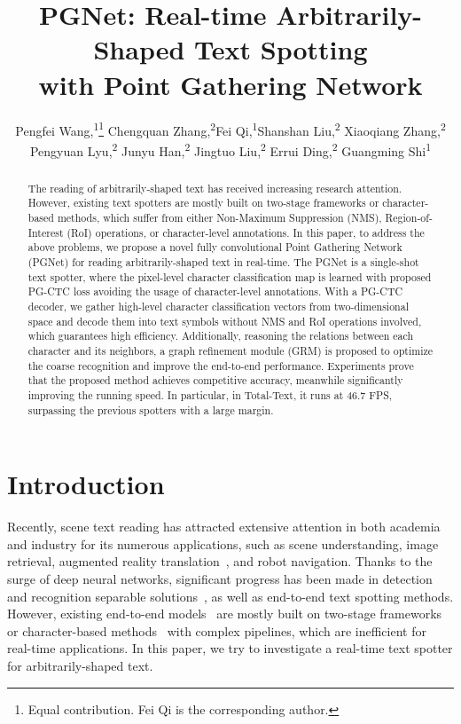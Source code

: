 \documentclass[letterpaper]{article} \usepackage{aaai21}  \usepackage{times}  \usepackage{helvet} \usepackage{courier}  \usepackage[hyphens]{url}  \usepackage{graphicx} \urlstyle{rm} \def\UrlFont{\rm}  \usepackage{natbib}  \usepackage{caption} \usepackage{bm}
\title{PGNet: Real-time Arbitrarily-Shaped Text Spotting\\ with Point Gathering Network}
\author{
Pengfei Wang,\textsuperscript{\rm 1}\thanks{Equal contribution. Fei Qi is the corresponding author.}
    Chengquan Zhang,\textsuperscript{\rm 2}\footnotemark[1]
    Fei Qi,\textsuperscript{\rm 1}\footnotemark[1]
    Shanshan Liu,\textsuperscript{\rm 2}
    Xiaoqiang Zhang,\textsuperscript{\rm 2} \\
    Pengyuan Lyu,\textsuperscript{\rm 2} 
    Junyu Han,\textsuperscript{\rm 2}
    Jingtuo Liu,\textsuperscript{\rm 2}
    Errui Ding,\textsuperscript{\rm 2}
    Guangming Shi\textsuperscript{\rm 1}\\
}
\begin{document}
\maketitle
\begin{abstract}
The reading of arbitrarily-shaped text has received increasing research attention. However, existing text spotters are mostly built on two-stage frameworks or character-based methods, which suffer from either Non-Maximum Suppression (NMS), Region-of-Interest (RoI) operations, or character-level annotations. In this paper, to address the above problems, we propose a novel fully convolutional Point Gathering Network (PGNet) for reading arbitrarily-shaped text in real-time. The PGNet is a single-shot text spotter, where the pixel-level character classification map is learned with proposed PG-CTC loss avoiding the usage of character-level annotations. With a PG-CTC decoder, we gather high-level character classification vectors from two-dimensional space and decode them into text symbols without NMS and RoI operations involved, which guarantees high efficiency. Additionally, reasoning the relations between each character and its neighbors, a graph refinement module (GRM) is proposed to optimize the coarse recognition and improve the end-to-end performance. Experiments prove that the proposed method achieves competitive accuracy, meanwhile significantly improving the running speed. In particular, in Total-Text, it runs at 46.7 FPS, surpassing the previous spotters with a large margin.
\end{abstract}

\section{Introduction}
Recently, scene text reading has attracted extensive attention in both academia and industry for its numerous applications, such as scene understanding, image retrieval, augmented reality translation~\cite{wu2019editing}, and robot navigation. Thanks to the surge of deep neural networks, significant progress has been made in detection and recognition separable solutions~\cite{wu2017self, long2018textsnake, wang2019shape, wang2019single, Zhan2019CVPR,shi2018aster, yu2020accurate, wan20192dctc},  as well as end-to-end text spotting methods. However, existing end-to-end models~\cite{sun2018textnet, liu2018fots, feng2019textdragon} are mostly built on two-stage frameworks or character-based methods~\cite{xing2019convolutional,yao2018mask} with complex pipelines, which are inefficient for real-time applications. In this paper, we try to investigate a real-time text spotter for arbitrarily-shaped text.
\end{document}
